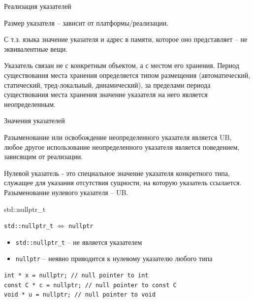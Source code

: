 \documentclass[unknownkeysallowed,xcolor=table]{beamer}
\begin{document}
\begin{frame}{Реализация указателей}

Размер указателя -- зависит от платформы/реализации.

\vspace{2em}

С т.з. языка значение указателя и адрес в памяти, которое оно представляет -- не эквивалентные вещи.

\vspace{2em}

Указатель связан не с конкретным объектом, а с местом его хранения. Период существования места хранения определяется типом размещения (автоматический, статический, тред-локальный, динамический), за пределами периода существования места хранения значение указателя на него является неопределенным.

\end{frame}

\begin{frame}{Значения указателей}

Разыменование или освобождение неопределенного указателя является UB, любое другое использование неопределенного указателя является поведением, зависящим от реализации.

\vspace{2em}

Нулевой указатель - это специальное значение указателя конкретного типа, служащее для указания отсутствия сущности, на которую указатель ссылается. Разыменование нулевого указателя -- UB.

\end{frame}

\begin{frame}[fragile]{std::nullptr\_t}

\begin{center}
\lstinline{std::nullptr_t} $\Leftrightarrow$ \lstinline{nullptr}
\end{center}

\vspace{1em}

\begin{itemize}
  \item \lstinline{std::nullptr_t} -- не является указателем
  \item \lstinline{nullptr} -- неявно приводится к нулевому указателю любого типа
\end{itemize}

\begin{lstlisting}
int * x = nullptr; // null pointer to int
const C * c = nullptr; // null pointer to const C
void * u = nullptr; // null pointer to void
\end{lstlisting}

\end{frame}
\end{document}
